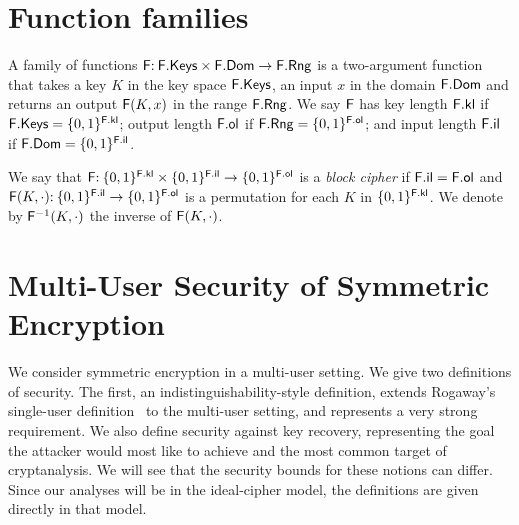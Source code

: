 
\section{Function families}\label{sec-ff}


A family of functions $\mathsf{F} {:\:} \mathsf{F}.\mathsf{Keys} \times \mathsf{F}.\mathsf{Dom}\to \mathsf{F}.\mathsf{Rng}$ is a two-argument function that takes a key $K$ in the key space $\mathsf{F}.\mathsf{Keys}$, an input $x$ in the domain $\mathsf{F}.\mathsf{Dom}$ and returns an output $\mathsf{F}(K,x)$ in the range $\mathsf{F}.\mathsf{Rng}$. We say $\mathsf{F}$ has key length $\mathsf{F}.\mathsf{kl}$ if
$\mathsf{F}.\mathsf{Keys}=\{0,1\}^{\mathsf{F}.\mathsf{kl}}$; output length $\mathsf{F}.\mathsf{ol}$ if $\mathsf{F}.\mathsf{Rng}=\{0,1\}^{\mathsf{F}.\mathsf{ol}}$; and input length $\mathsf{F}.\mathsf{il}$ if $\mathsf{F}.\mathsf{Dom}=\{0,1\}^{\mathsf{F}.\mathsf{il}}$.

We say that $\mathsf{F}{:\:} \{0,1\}^{\mathsf{F}.\mathsf{kl}}\times \{0,1\}^{\mathsf{F}.\mathsf{il}}\to\{0,1\}^{\mathsf{F}.\mathsf{ol}}$ is a \emph{block cipher} if $\mathsf{F}.\mathsf{il}=\mathsf{F}.\mathsf{ol}$ and $\mathsf{F}(K,\cdot) {:\:} \{0,1\}^{\mathsf{F}.\mathsf{il}}\to\{0,1\}^{\mathsf{F}.\mathsf{ol}}$ is a permutation for each $K$ in $\{0,1\}^{\mathsf{F}.\mathsf{kl}}$. We denote by $\mathsf{F}^{-1}(K,\cdot)$ the inverse of $\mathsf{F}(K,\cdot)$.






\section{Multi-User Security of Symmetric Encryption}\label{sec-mu-defs}

We consider symmetric encryption in a multi-user setting. We give two definitions of security. The first, an indistinguishability-style definition, extends Rogaway's single-user definition~\cite{CCS:Rogaway02} to the multi-user setting, and represents a very strong requirement. We also define security against key recovery, representing the goal the attacker would most like to achieve and the most common target of cryptanalysis. We will see that the security bounds for these notions can differ. Since our analyses will be in the ideal-cipher model, the definitions are given directly in that model.


